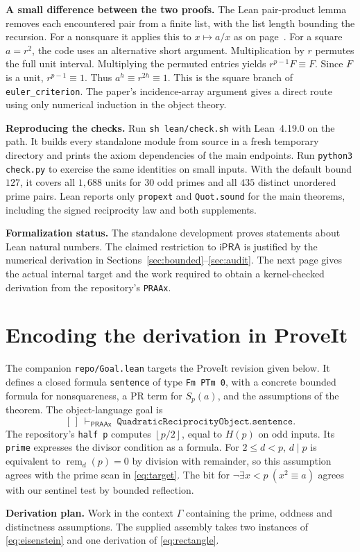 \documentclass[12pt,letterpaper]{article}
\newcommand{\sect}[1]{\section{\texorpdfstring{\color{accent}#1}{#1}}}
\newcommand{\lab}[1]{\textbf{#1.}\enspace}
\newcommand{\floor}[1]{\left\lfloor#1\right\rfloor}
\newcommand{\remn}{\operatorname{rem}}
\newcommand{\ipra}{\mathsf{iPRA}}
\newcommand{\code}[1]{\texttt{#1}}
\begin{document}
\lab{A small difference between the two proofs} The Lean pair-product lemma removes each encountered pair from a finite list, with the list length bounding the recursion. For a nonsquare it applies this to $x\mapsto a/x$ as on page~\pageref{sec:euler}. For a square $a=r^2$, the code uses an alternative short argument. Multiplication by $r$ permutes the full unit interval. Multiplying the permuted entries yields $r^{p-1}F\equiv F$. Since $F$ is a unit, $r^{p-1}\equiv1$. Thus $a^h\equiv r^{2h}\equiv1$. This is the square branch of \code{euler\_criterion}. The paper's incidence-array argument gives a direct route using only numerical induction in the object theory.

\lab{Reproducing the checks} Run \code{sh lean/check.sh} with Lean~4.19.0 on the path. It builds every standalone module from source in a fresh temporary directory and prints the axiom dependencies of the main endpoints. Run \code{python3 check.py} to exercise the same identities on small inputs. With the default bound $127$, it covers all $1{,}688$ units for $30$ odd primes and all $435$ distinct unordered prime pairs. Lean reports only \code{propext} and \code{Quot.sound} for the main theorems, including the signed reciprocity law and both supplements.

\lab{Formalization status} The standalone development proves statements about Lean natural numbers. The claimed restriction to $\ipra$ is justified by the numerical derivation in Sections~\ref{sec:bounded}--\ref{sec:audit}. The next page gives the actual internal target and the work required to obtain a kernel-checked derivation from the repository's \code{PRAAx}.
\clearpage
\sect{Encoding the derivation in ProveIt}\label{sec:object}
The companion \code{repo/Goal.lean} targets the ProveIt revision given below. It defines a closed formula \code{sentence} of type \code{Fm PTm 0}, with a concrete bounded formula for nonsquareness, a PR term for $S_p(a)$, and the assumptions of the theorem. The object-language goal is
\[
  [\,]\ \vdash_{\mathsf{PRAAx}}\ \texttt{QuadraticReciprocityObject.sentence}.
\]
The repository's \code{half p} computes $\floor{p/2}$, equal to $H(p)$ on odd inputs. Its \code{prime} expresses the divisor condition as a formula. For $2\le d<p$, $d\mid p$ is equivalent to $\remn_d(p)=0$ by division with remainder, so this assumption agrees with the prime scan in \eqref{eq:target}. The bit for $\neg\exists x<p\ (x^2\equiv a)$ agrees with our sentinel test by bounded reflection.

\lab{Derivation plan} Work in the context $\Gamma$ containing the prime, oddness and distinctness assumptions. The supplied assembly takes two instances of \eqref{eq:eisenstein} and one derivation of \eqref{eq:rectangle}.
\end{document}
